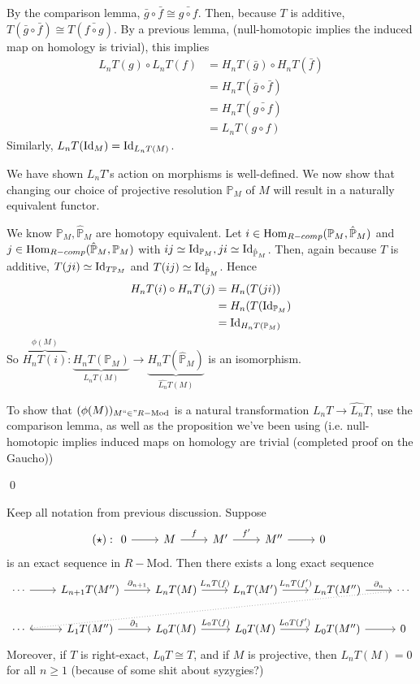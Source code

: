 \documentclass[x11names,reqno,14pt]{extarticle}
\newcommand{\fin}{``\in"}
\newcommand{\RMod}{R-\text{Mod}}
\newcommand{\barf}{\bar{f}}
\renewcommand{\P}{\mathbb{P}}
\begin{document}
By the comparison lemma, $\bar{g}\circ\barf \cong \bar{g\circ f}$. Then, because $T$ is additive, $T(\bar{g}\circ\barf) \cong T(\bar{f\circ g})$. By a previous lemma, (null-homotopic implies the induced map on homology is trivial), this implies 
\begin{align*}
L_nT(g) \circ L_nT(f) & = H_nT(\bar{g})\circ H_nT(\barf) \\&= H_nT(\bar{g}\circ\barf) \\&= H_nT(\bar{g\circ f}) \\& = L_nT(g\circ f)
\end{align*} 
Similarly, $L_nT(\operatorname{\mathrm{Id}}_M) = \operatorname{\mathrm{Id}}_{L_nT(M)}$. 

We have shown $L_nT$'s action on morphisms is well-defined. We now show that changing our choice of projective resolution $\P_M$ of $M$ will result in a naturally equivalent functor. 

We know $\P_M, \hat{\P}_M$ are homotopy equivalent. Let $i\in\Hom_{R-comp}(\P_M, \hat{\P}_M)$ and $j \in \Hom_{R-comp}(\hat{\P}_M, \P_M)$ with $ij \simeq \Id_{\P_M}, ji \simeq \Id_{\hat{\P}_M}$. Then, again because $T$ is additive, $T(ji) \simeq \Id_{T\P_M}$ and $T(ij) \simeq \Id_{\hat{\P}_M}$. Hence 
\begin{align*}
H_nT(i) \circ H_nT(j) & = H_n(T(ji))\\
& = H_n(T(\Id_{\P_M}) \\
& = \Id_{H_nT(\P_M)} \\
\end{align*}
So $\overbrace{H_nT(i)}^{\phi(M)}:\underbrace{H_nT(\P_M)}_{L_nT(M)} \to \underbrace{H_nT(\hat{\P}_M)}_{\hat{L_n}T(M)}$ is an isomorphism.

To show that $(\phi(M))_{M\fin\RMod}$ is a natural transformation $L_nT\to\hat{L_n}T$, use the comparison lemma, as well as the proposition we've been using (i.e. null-homotopic implies induced maps on homology are trivial (completed proof on the Gaucho))

\qed

\thm 

Keep all notation from previous discussion. Suppose
\[
(\star):\exactshort{M}{f}{M'}{f'}{M''}
\]
is an exact sequence in $\RMod$. Then there exists a long exact sequence
\[
\begin{tikzcd}
\cdots \ar[r]&L_{n + 1}T(M'') \ar[r, "\del_{n + 1}"] & L_nT(M)\ar[r, "L_nT(f)"] & L_nT(M') \ar[r, "L_nT(f')"] & L_nT(M'') \ar[r, "\del_n"] & \cdots \ar[dlllll, dotted]\\
\cdots \ar[r] & L_1T(M'')\ar[r, "\del_1"] & L_0T(M) \ar[r, "L_0T(f)"] & L_0T(M) \ar[r, "L_0T(f')"] & L_0T(M'') \ar[r] & 0 
\end{tikzcd}
\]
Moreover, if $T$ is right-exact, $L_0T\cong T$, and if $M$ is projective, then $L_nT(M) = 0$ for all $n \geq 1$ (because of some shit about syzygies?)
\end{document}
